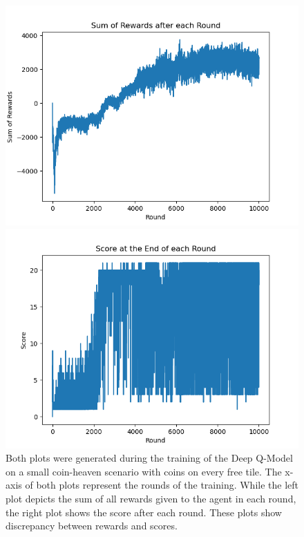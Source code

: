 \begin{figure}[H]
    \centering
    \begin{minipage}{0.49\textwidth}
		\centering
		\includegraphics[scale=0.52]{images/rewards_converged.png}
    \end{minipage}
    \begin{minipage}{0.49\textwidth}
	\centering
		\includegraphics[scale=0.52]{images/scores_not_converged.png}
    \end{minipage}
    \caption{Both plots were generated during the training of the Deep Q-Model on a small coin-heaven scenario with coins on every free tile. The x-axis of both plots represent the rounds of the training. While the left plot depicts the sum of all rewards given to the agent in each round, the right plot shows the score after each round. These plots show discrepancy between rewards and scores.}
    \label{fig:rewardVSscore}
\end{figure}

